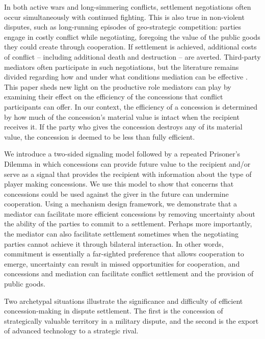 \documentclass[bibtex,autowc]{apsr_submission}
\begin{document}
In both active wars and long-simmering conflicts, settlement negotiations often occur simultaneously with continued fighting. This is also true in non-violent disputes, such as long-running episodes of geo-strategic competition: parties engage in costly conflict while negotiating, foregoing the value of the public goods they could create through cooperation. If settlement is achieved, additional costs of conflict -- including additional death and destruction -- are averted. Third-party mediators often participate in such negotiations, but the literature remains divided regarding how and under what conditions mediation can be effective \citep{bercovitch2000why, greig2005a, beardsley2006mediation, duursma2020}. This paper sheds new light on the productive role mediators can play by examining their effect on the efficiency of the concessions that conflict participants can offer. In our context, the efficiency of a concession is determined by how much of the concession's material value is intact when the recipient receives it. If the party who gives the concession destroys any of its material value, the concession is deemed to be less than fully efficient.

We introduce a two-sided signaling model followed by a repeated Prisoner's Dilemma in which concessions can provide future value to the recipient and/or serve as a signal that provides the recipient with information about the type of player making concessions. We use this model to show that concerns that concessions could be used against the giver in the future can undermine cooperation. Using a mechanism design framework, we demonstrate that a mediator can facilitate more efficient concessions by removing uncertainty about the ability of the parties to commit to a settlement. Perhaps more importantly, the mediator can also facilitate settlement sometimes when the negotiating parties cannot achieve it through bilateral interaction. In other words, commitment is essentially a far-sighted preference that allows cooperation to emerge, uncertainty can result in missed opportunities for cooperation, and concessions and mediation can facilitate conflict settlement and the provision of public goods.

Two archetypal situations illustrate the significance and difficulty of efficient concession-making in dispute settlement. The first is the concession of strategically valuable territory in a military dispute, and the second is the export of advanced technology to a strategic rival. %
\end{document}
